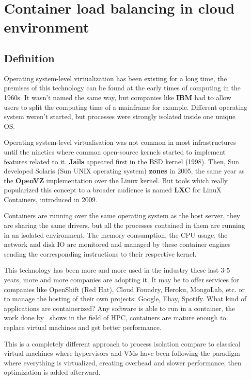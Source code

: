 \chapter{Container load balancing in cloud environment}
\label{mainidea}

\section{Definition}

Operating system-level virtualization has been existing for a long time, the
premises of this technology can be found at the early times of computing in the
1960s. It wasn't named the same way, but companies like \textbf{IBM} had to
allow users to split the computing time of a mainframe for example. Different
operating system weren't started, but processes were strongly isolated inside
one unique OS.

Operating system-level virtualisation was not common in most infrastructures
until the nineties where common open-source kernels started to implement
features related to it. \textbf{Jails} appeared first in the BSD kernel (1998).
Then, Sun developed Solaris (Sun UNIX operating system) \textbf{zones} in 2005,
the same year as the \textbf{OpenVZ} implementation over the Linux kernel. But
tools which really popularized this concept to a broader audience is named
\textbf{LXC} for LinuX Containers, introduced in 2009.

Containers are running over the same operating system as the host server, they
are sharing the same drivers, but all the processes contained in them are
running in an isolated environment. The memory consumption, the CPU usage, the
network and disk IO are monitored and managed by these container engines
sending the corresponding instructions to their respective kernel. 

This technology has been more and more used in the industry these last 3-5
years, more and more companies are adopting it. It may be to offer services for
companies like OpenShift (Red Hat), Cloud Foundry, Heroku, MongoLab, etc\@. or to
manage the hosting of their own projects: Google, Ebay, Spotify. What kind of
applications are containerized? Any software is able to run in a container, the
work done by~\citet*{hpccontainers} shows in the field of HPC, containers are
mature enough to replace virtual machines and get better performance.

This is a completely different approach to process isolation compare to
classical virtual machines where hypervisors and VMs have been following the
paradigm where everything is virtualized, creating overhead and slower
performance, then optimization is added afterward.

